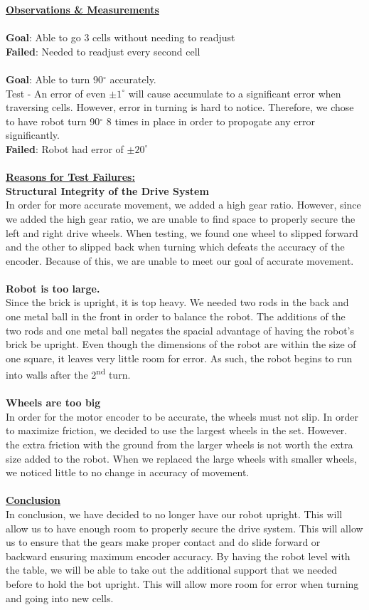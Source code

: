 \documentclass[11pt]{article}
\newcommand{\ts}{\textsuperscript}
\begin{document}
\underline{\textbf{Observations \& Measurements}}\\\\
\textbf{Goal}: Able to go 3 cells without needing to readjust\\
\textbf{Failed}: Needed to readjust every second cell\\\\
\textbf{Goal}: Able to turn 90$^{\circ}$ accurately.\\
Test - An error of even $ \pm 1^{\circ}$ will cause accumulate to a significant error when traversing cells. However, error in turning is hard to notice. Therefore, we chose to have robot turn 90$^{\circ}$ 8 times in place in order to propogate any error significantly. \\
\textbf{Failed}: Robot had error of $ \pm 20^{\circ}$\\\\
\textbf{\underline{Reasons for Test Failures:}}\\
\textbf{Structural Integrity of the Drive System}\\
In order for more accurate movement, we added a high gear ratio. However, since we added the high gear ratio, we are unable to find space to properly secure the left and right drive wheels. When testing, we found one wheel to slipped forward and the other to slipped back when turning which defeats the accuracy of the encoder. Because of this, we are unable to meet our goal of accurate movement.\\\\
\textbf{Robot is too large.}\\
Since the brick is upright, it is top heavy. We needed two rods in the back and one metal ball in the front in order to balance the robot. The additions of the two rods and one metal ball negates the spacial advantage of having the robot's brick be upright. Even though the dimensions of the robot are within the size of one square, it leaves very little room for error. As such, the robot begins to run into walls after the 2\ts{nd} turn.\\\\
\textbf{Wheels are too big}\\
In order for the motor encoder to be accurate, the wheels must not slip. In order to maximize friction, we decided to use the largest wheels in the set. However. the extra friction with the ground from the larger wheels is not worth the extra size added to the robot. When we replaced the large wheels with smaller wheels, we noticed little to no change in accuracy of movement. 
\\\\
\underline{\textbf{Conclusion}}\\
In conclusion, we have decided to no longer have our robot upright. This will allow us to have enough room to properly secure the drive system. This will allow us to ensure that the gears make proper contact and do slide forward or backward ensuring maximum encoder accuracy. By having the robot level with the table, we will be able to take out the additional support that we needed before to hold the bot upright. This will allow more room for error when turning and going into new cells.
\newpage
\end{document}
